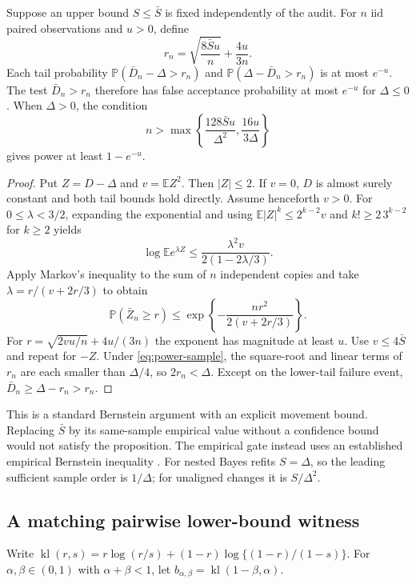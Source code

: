 \begin{proposition}
\label{prop:movement-upper}
Suppose an upper bound $S\le\bar S$ is fixed independently of the audit.
For $n$ iid paired observations and $u>0$, define
\[
 r_n=\sqrt{\frac{8\bar S u}{n}}+\frac{4u}{3n}.
\]
Each tail probability
$\mathbb P(\bar D_n-\Delta>r_n)$ and
$\mathbb P(\Delta-\bar D_n>r_n)$ is at most $e^{-u}$.
The test $\bar D_n>r_n$ therefore has false acceptance probability at most
$e^{-u}$ for $\Delta\le0$. When $\Delta>0$, the condition
\begin{equation}
 n>\max\left\{\frac{128\bar S u}{\Delta^2},
                  \frac{16u}{3\Delta}\right\}
 \label{eq:power-sample}
\end{equation}
gives power at least $1-e^{-u}$.
\end{proposition}
\begin{proof}
Put $Z=D-\Delta$ and $v=\mathbb EZ^2$. Then $|Z|\le2$.
If $v=0$, $D$ is almost surely constant and both tail bounds hold directly.
Assume henceforth $v>0$.
For $0\le\lambda<3/2$, expanding the exponential and using
$\mathbb E|Z|^k\le2^{k-2}v$ and
$k!\ge2\,3^{k-2}$ for $k\ge2$ yields
\[
 \log\mathbb Ee^{\lambda Z}
 \le\frac{\lambda^2v}{2(1-2\lambda/3)}.
\]
Apply Markov's inequality to the sum of $n$ independent copies and take
$\lambda=r/(v+2r/3)$ to obtain
\[
 \mathbb P(\bar Z_n\ge r)
 \le\exp\left\{-\frac{nr^2}{2(v+2r/3)}\right\}.
\]
For $r=\sqrt{2vu/n}+4u/(3n)$ the exponent has magnitude at least $u$.
Use $v\le4\bar S$ and repeat for $-Z$. Under
\eqref{eq:power-sample}, the square-root and linear terms of $r_n$ are
each smaller than $\Delta/4$, so $2r_n<\Delta$. Except on the lower-tail
failure event, $\bar D_n\ge\Delta-r_n>r_n$.
\end{proof}

This is a standard Bernstein argument with an explicit movement bound.
Replacing $\bar S$ by its same-sample empirical value without a confidence
bound would not satisfy the proposition. The empirical gate instead uses
an established empirical Bernstein inequality \cite{maurer2009}.
For nested Bayes refits $S=\Delta$, so the leading sufficient sample order
is $1/\Delta$; for unaligned changes it is $S/\Delta^2$.

\subsection{A matching pairwise lower-bound witness}

Write
$\operatorname{kl}(r,s)=r\log(r/s)+(1-r)\log\{(1-r)/(1-s)\}$.
For $\alpha,\beta\in(0,1)$ with $\alpha+\beta<1$, let
$b_{\alpha,\beta}=\operatorname{kl}(1-\beta,\alpha)$.

